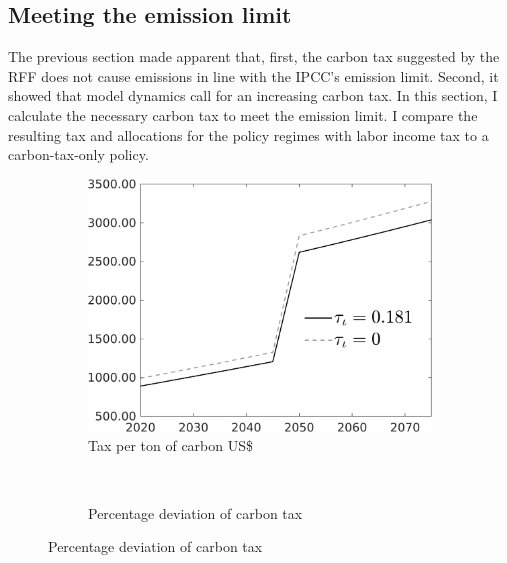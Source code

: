   
\subsection{Meeting the emission limit}\label{subsec:meetlim}
 
 The previous section made apparent that, first, the carbon tax suggested by the RFF does not cause emissions in line with the IPCC's emission limit.  Second, it showed that model dynamics call for an increasing carbon tax. In this section, I calculate the necessary carbon tax to meet the emission limit. I compare the resulting tax and allocations for the policy regimes with labor income tax to a carbon-tax-only policy.
 

 \begin{figure}[h!!]
 	\centering
 	\caption{Necessary carbon tax with and without progressive income tax  }\label{fig:Limit_nsk0_xgr0_know}		
 	\begin{subfigure}[]{0.4\textwidth}
 		\caption{Tax per ton of carbon US\$}
 		\includegraphics[width=1\textwidth]{../../codding_model/own_basedOnFried/optimalPol_010922_revision/figures/all_13Sept22/CompTauf_bytaul_Reg5_Tauf_spillover0_nsk0_xgr0_knspil0_sep0_LFlimit1_emsbase0_countec0_GovRev0_etaa0.79_lgd1.png}
 	\end{subfigure}	
 \begin{minipage}[]{0.1\textwidth}
\
 \end{minipage}
 	\begin{subfigure}[]{0.4\textwidth}
 	\caption{Percentage deviation of carbon tax}

\end{subfigure}
\end{figure}
